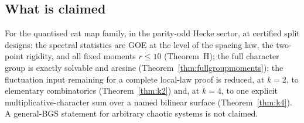 \subsection{What is claimed}

For the quantised cat map family, in the parity-odd Hecke sector, at
certified split designs: the spectral statistics are GOE at the level of
the spacing law, the two-point rigidity, and all fixed moments
$r \le 10$ (Theorem~H); the full character group is exactly solvable and
arcsine (Theorem~\ref{thm:fullgroupmoments}); the fluctuation input
remaining for a complete local-law proof is reduced, at $k = 2$, to
elementary combinatorics (Theorem~\ref{thm:k2}) and, at $k = 4$, to one
explicit multiplicative-character sum over a named bilinear surface
(Theorem~\ref{thm:k4}).  A general-BGS statement for arbitrary chaotic
systems is not claimed.
